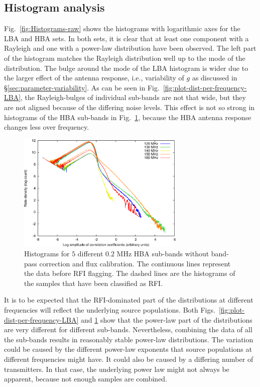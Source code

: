 \documentclass[useAMS,usenatbib]{mn2e}
\begin{document}
\subsection{Histogram analysis}
Fig.~\ref{fig:Histograms-raw} shows the histograms with logarithmic axes for the LBA and HBA sets. In both sets, it is clear that at least one component with a Rayleigh and one with a power-law distribution have been observed. The left part of the histogram matches the Rayleigh distribution well up to the mode of the distribution. The bulge around the mode of the LBA histogram is wider due to the larger effect of the antenna response, i.e., variability of $g$ as discussed in \S\ref{sec:parameter-variability}. As can be seen in Fig.~\ref{fig:plot-dist-per-frequency-LBA}, the Rayleigh-bulges of individual sub-bands are not that wide, but they are not aligned because of the differing noise levels. This effect is not so strong in histograms of the HBA sub-bands in Fig.~\ref{fig:plot-dist-per-frequency-HBA}, because the HBA antenna response changes less over frequency.

\begin{figure}
\begin{center}
\includegraphics[width=8cm]{img/plot-hba-dist-per-frequency-trimmed}
\caption{Histograms for $5$ different $0.2$ MHz HBA sub-bands without band-pass correction and flux calibration. The continuous lines represent the data before RFI flagging. The dashed lines are the histograms of the samples that have been classified as RFI.}
\label{fig:plot-dist-per-frequency-HBA}
\end{center}
\end{figure}

It is to be expected that the RFI-dominated part of the distributions at different frequencies will reflect the underlying source populations. Both Figs.~\ref{fig:plot-dist-per-frequency-LBA} and \ref{fig:plot-dist-per-frequency-HBA} show that the power-law part of the distributions are very different for different sub-bands. Nevertheless, combining the data of all the sub-bands results in reasonably stable power-law distributions. The variation could be caused by the different power-law exponents that source populations at different frequencies might have. It could also be caused by a differing number of transmitters. In that case, the underlying power law might not always be apparent, because not enough samples are combined.
\end{document}
